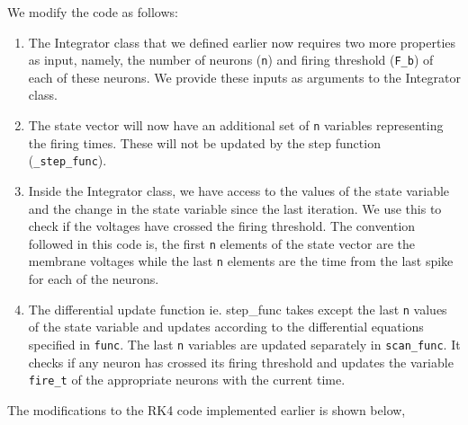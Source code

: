 \documentclass[10pt,letterpaper]{article}
\begin{document}
\begin{nolinenumbers}
We modify the code as follows:
\begin{enumerate}
\item The Integrator class that we defined earlier now requires two more properties as input, namely, the number of neurons (\texttt{n}) and firing threshold (\texttt{F\_b}) of each of these neurons. We provide these inputs as arguments to the Integrator class.
\item The state vector will now have an additional set of \texttt{n} variables representing the firing times. These will not be updated by the step function (\texttt{\_step\_func}).
\item Inside the Integrator class, we have access to the values of the state variable and the change in the state variable since the last iteration. We use this to check if the voltages have crossed the firing threshold. The convention followed in this code is, the first \texttt{n} elements of the state vector are the membrane voltages while the last \texttt{n} elements are the time from the last spike for each of the neurons.
\item The differential update function ie. step\_func takes except the last \texttt{n} values of the state variable and updates according to the differential equations specified in \texttt{func}. The last \texttt{n} variables are updated separately in \texttt{scan\_func}. It checks if any neuron has crossed its firing threshold and updates the variable \texttt{fire\_t} of the appropriate neurons with the current time.
\end{enumerate}

The modifications to the RK4 code implemented earlier is shown below,

\begin{verbatim}


\end{verbatim}
\end{nolinenumbers}
\end{document}
